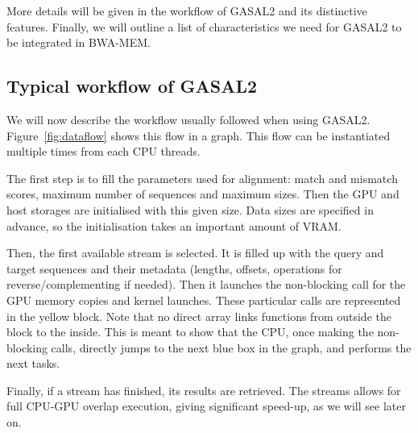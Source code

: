 More details will be given in the workflow of GASAL2 and its distinctive features. Finally, we will outline a list of characteristics we need for GASAL2 to be integrated in BWA-MEM.


\subsection{Typical workflow of GASAL2}

We will now describe the workflow usually followed when using GASAL2. Figure~\ref{fig:dataflow} shows this flow in a graph. This flow can be instantiated multiple times from each CPU threads.

The first step is to fill the parameters used for alignment: match and mismatch scores, maximum number of sequences and maximum sizes. Then the GPU and host storages are initialised with this given size. Data sizes are specified in advance, so the initialisation takes an important amount of VRAM.

Then, the first available stream is selected. It is filled up with the query and target sequences and their metadata (lengths, offsets, operations for reverse/complementing if needed). Then it launches the non-blocking call for the GPU memory copies and kernel launches. These particular calls are represented in the yellow block. Note that no direct array links functions from outside the block to the inside. This is meant to show that the CPU, once making the non-blocking calls, directly jumps to the next blue box in the graph, and performs the next tasks.

Finally, if a stream has finished, its results are retrieved. The streams allows for full CPU-GPU overlap execution, giving significant speed-up, as we will see later on.

